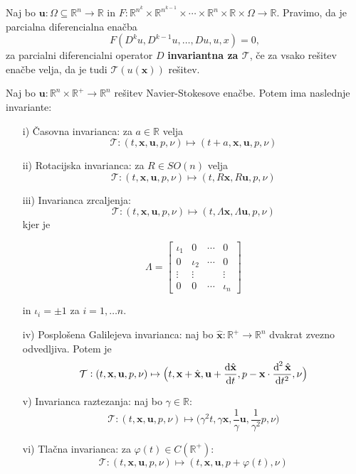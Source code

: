 \documentclass[mat2, tisk]{fmfdelo}
\newcommand{\R}{\mathbb R}
\newcommand{\bd}{\textbf}
\begin{document}
\begin{definicija}
Naj bo $\bd{u}: \Omega \subseteq \R^n \rightarrow \R$ in 
$F: \R^{n^k} \times \R^{n^{k-1}} \times \cdots \times\R^n \times \R \times \Omega \rightarrow \R$. 
Pravimo, da je parcialna diferencialna enačba 
$$
F(D^k u, D^{k-1}u, \dots, D u, u, x) = 0,
$$
za parcialni diferencialni operator $D$ \bd{invariantna za $\mathcal{T}$}, če za 
vsako rešitev enačbe velja, da je tudi $\mathcal{T}(u(\bd{x}))$ rešitev.
\end{definicija}

\begin{trditev}
Naj bo $\bd{u}: \R^n \times \R^+ \rightarrow \R^n$ rešitev Navier-Stokesove enačbe. 
Potem ima naslednje invariante: 
\begin{enumerate}
  \item[i)] Časovna invarianca: za $a\in \R$ velja $$\mathcal{T}: (t, \bd{x}, \bd{u}, p, \nu) \mapsto (t + a, \bd{x}, \bd{u}, p, \nu)$$
  \item[ii)] Rotacijska invarianca: za $R \in SO(n)$ velja $$\mathcal{T}: (t, \bd{x}, \bd{u}, p, \nu) \mapsto (t, R\bd{x}, R\bd{u}, p, \nu)$$
  \item[iii)] Invarianca zrcaljenja: $$ \mathcal{T}: (t, \bd{x}, \bd{u}, p, \nu) \mapsto (t, \Lambda\bd{x}, \Lambda \bd{u}, p, \nu)$$
kjer je

\[ \Lambda = \begin{bmatrix}
   \iota_1 & 0 & \cdots & 0 \\
   0 & \iota_2 & \cdots & 0 \\
   \vdots  & \vdots  &  & \vdots  \\
   0 & 0 & \cdots & \iota_n
 \end{bmatrix} \]

in $\iota_i = \pm 1$ za $i = 1, \dots n$.
  \item[iv)] Posplošena Galilejeva invarianca: naj bo $\hat{\bd{x}}: \R^+ \rightarrow \R^n$ dvakrat zvezno odvedljiva. Potem je 
  $$\mathcal{T}: (t, \bd{x}, \bd{u}, p, \nu) \mapsto \big(t, \bd{x} + \hat{\bd{x}}, \bd{u} + \frac{\dif \hat{\bd{x}}}{\dif t}, p - \bd{x} \cdot \frac{\dif^{\,2} \hat{\bd{x}}}{\dif t^2}, \nu\big)$$
  \item[v)] Invarianca raztezanja: naj bo $\gamma\in \R$: 
  $$\mathcal{T}: (t, \bd{x}, \bd{u}, p, \nu) \mapsto \big(\gamma^2 t, \gamma\bd{x}, \frac{1}{\gamma} \bd{u}, \frac{1}{\gamma^2} p, \nu\big)$$
  \item[vi)] Tlačna invarianca: za $\varphi(t) \in C(\R^+)$: 
  $$\mathcal{T}: (t, \bd{x}, \bd{u}, p, \nu) \mapsto (t, \bd{x}, \bd{u}, p + \varphi(t), \nu) $$
\end{enumerate}
\end{trditev}
\end{document}
